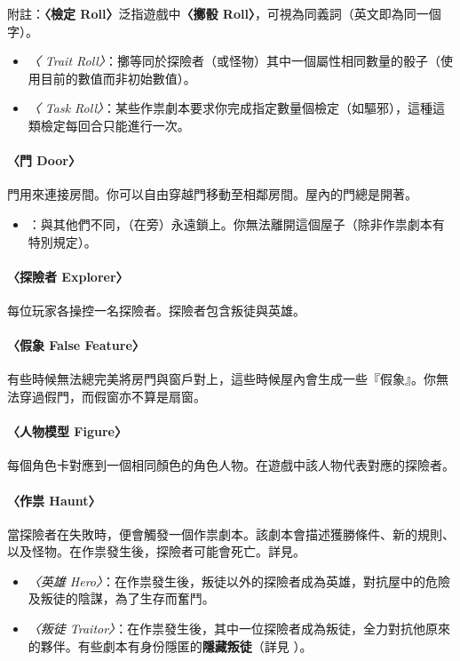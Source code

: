 附註：\textbf{〈檢定 Roll〉}泛指遊戲中\textbf{〈擲骰 Roll〉}，可視為同義詞（英文即為同一個字）。

\begin{itemize}
  \item \textit{〈 Trait Roll〉}：擲等同於探險者（或怪物）其中一個屬性相同數量的骰子（使用目前的數值而非初始數值）。
  \item \textit{〈 Task Roll〉}：某些作祟劇本要求你完成指定數量個檢定（如驅邪），這種這類檢定每回合只能進行一次。
\end{itemize}

\paragraph{〈門 Door〉}
門用來連接房間。你可以自由穿越門移動至相鄰房間。屋內的門總是開著。

\begin{itemize}
  \item \textit{}：與其他們不同，（在旁）永遠鎖上。你無法離開這個屋子（除非作祟劇本有特別規定）。
\end{itemize}

\paragraph{〈探險者 Explorer〉}
每位玩家各操控一名探險者。探險者包含叛徒與英雄。

\paragraph{〈假象 False Feature〉}
有些時候無法總完美將房門與窗戶對上，這些時候屋內會生成一些『假象』。你無法穿過假門，而假窗亦不算是扇窗。

\paragraph{〈人物模型 Figure〉}
每個角色卡對應到一個相同顏色的角色人物。在遊戲中該人物代表對應的探險者。

\paragraph{〈作祟 Haunt〉}
當探險者在失敗時，便會觸發一個作祟劇本。該劇本會描述獲勝條件、新的規則、以及怪物。在作祟發生後，探險者可能會死亡。詳見。

\begin{itemize}
  \item \textit{〈英雄 Hero〉}：在作祟發生後，叛徒以外的探險者成為英雄，對抗屋中的危險及叛徒的陰謀，為了生存而奮鬥。
  \item \textit{〈叛徒 Traitor〉}：在作祟發生後，其中一位探險者成為叛徒，全力對抗他原來的夥伴。有些劇本有身份隱匿的\textbf{隱藏叛徒}（詳見 ）。
\end{itemize}

